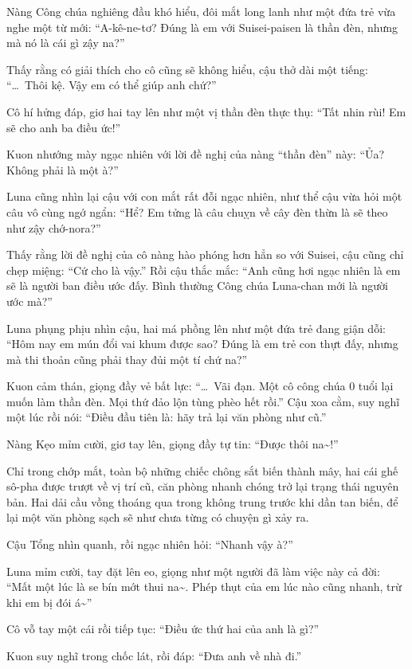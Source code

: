 \documentclass[../main.tex]{subfiles}
\begin{document}
Nàng Công chúa nghiêng đầu khó hiểu, đôi mắt long lanh như một đứa trẻ vừa nghe một từ mới: ``A-kê-ne-tơ? Đúng là em với Suisei-paisen là thần đèn, nhưng mà nó là cái gì zậy na?''

Thấy rằng có giải thích cho cô cũng sẽ không hiểu, cậu thở dài một tiếng: ``\dots\ Thôi kệ. Vậy em có thể giúp anh chứ?''

Cô hí hửng đáp, giơ hai tay lên như một vị thần đèn thực thụ: ``Tất nhin rùi! Em sẽ cho anh ba điều ức!''

Kuon nhướng mày ngạc nhiên với lời đề nghị của nàng ``thần đèn'' này: ``Ủa? Không phải là một à?''

Luna cũng nhìn lại cậu với con mắt rất đỗi ngạc nhiên, như thể cậu vừa hỏi một câu vô cùng ngớ ngẩn: ``Hể? Em tửng là câu chuỵn về cây đèn thừn là sẽ theo như zậy chớ-nora?''

Thấy rằng lời đề nghị của cô nàng hào phóng hơn hẳn so với Suisei, cậu cũng chỉ chẹp miệng: ``Cứ cho là vậy.'' Rồi cậu thắc mắc: ``Anh cũng hơi ngạc nhiên là em sẽ là người ban điều ước đấy. Bình thường Công chúa Luna-chan mới là người ước mà?''

Luna phụng phịu nhìn cậu, hai má phồng lên như một đứa trẻ đang giận dỗi: ``Hôm nay em mún đổi vai khum được sao? Đúng là em trẻ con thựt đấy, nhưng mà thi thoản cũng phải thay đủi một tí chứ na?''

Kuon cảm thán, giọng đầy vẻ bất lực: ``\dots\ Vãi đạn. Một cô công chúa 0 tuổi lại muốn làm thần đèn. Mọi thứ đảo lộn tùng phèo hết rồi.'' Cậu xoa cằm, suy nghĩ một lúc rồi nói: ``Điều đầu tiên là: hãy trả lại văn phòng như cũ.''

Nàng Kẹo mỉm cười, giơ tay lên, giọng đầy tự tin: ``Được thôi na\~{}!''

Chỉ trong chớp mắt, toàn bộ những chiếc chông sắt biến thành mây, hai cái ghế sô-pha được trượt về vị trí cũ, căn phòng nhanh chóng trở lại trạng thái nguyên bản. Hai dải cầu vồng thoáng qua trong không trung trước khi dần tan biến, để lại một văn phòng sạch sẽ như chưa từng có chuyện gì xảy ra.

Cậu Tổng nhìn quanh, rồi ngạc nhiên hỏi: ``Nhanh vậy à?''

Luna mỉm cười, tay đặt lên eo, giọng như một người đã làm việc này cả đời: ``Mất một lúc là se bín mớt thui na\~{}. Phép thụt của em lúc nào cũng nhanh, trừ khi em bị đói á\~{}''

Cô vỗ tay một cái rồi tiếp tục: ``Điều ức thứ hai của anh là gì?''

Kuon suy nghĩ trong chốc lát, rồi đáp: ``Đưa anh về nhà đi.''
\end{document}
